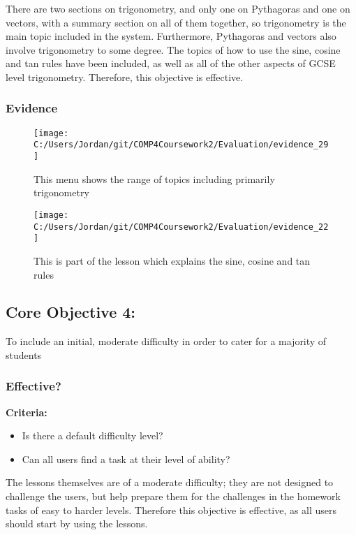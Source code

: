There are two sections on trigonometry, and only one on Pythagoras and one on vectors, with a summary section on all of them together, so trigonometry is the main topic included in the system. Furthermore, Pythagoras and vectors also involve trigonometry to some degree. The topics of how to use the sine, cosine and tan rules have been included, as well as all of the other aspects of GCSE level trigonometry. Therefore, this objective is effective.

\subsubsection{Evidence}

\begin{figure}[H]
	\texttt{[image: C:/Users/Jordan/git/COMP4Coursework2/Evaluation/evidence\_29]}
	\caption{This menu shows the range of topics including primarily trigonometry}
\end{figure}

\begin{figure}[H]
	\texttt{[image: C:/Users/Jordan/git/COMP4Coursework2/Evaluation/evidence\_22]}
	\caption{This is part of the lesson which explains the sine, cosine and tan rules}
\end{figure}

\subsection{Core Objective 4: }

To include an initial, moderate difficulty in order to cater for a majority of students

\subsubsection{Effective?}

\textbf{Criteria: }

\begin{itemize}
	\item Is there a default difficulty level?
	\item Can all users find a task at their level of ability?
\end{itemize}

The lessons themselves are of a moderate difficulty; they are not designed to challenge the users, but help prepare them for the challenges in the homework tasks of easy to harder levels. Therefore this objective is effective, as all users should start by using the lessons.

